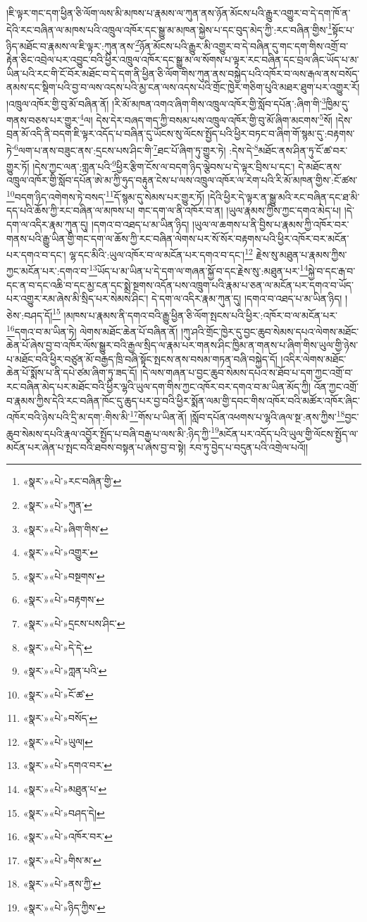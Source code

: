 །ཇི་ལྟར་གང་དག་ཕྱིན་ཅི་ལོག་ལས་མི་མཁས་པ་རྣམས་ལ་ཀུན་ནས་ཉོན་མོངས་པའི་རྒྱུར་འགྱུར་བ་དེ་དག་ཁོ་ན་དེའི་རང་བཞིན་ལ་མཁས་པའི་འཁྲུལ་འཁོར་དང་སྒྱུ་མ་མཁན་སྐྱེས་པ་དང་བུད་མེད་ཀྱི་:རང་བཞིན་གྱིས་\footnote{«སྣར་»«པེ་»རང་བཞིན་གྱི་}སྟོང་པ་ཉིད་མཐོང་བ་རྣམས་ལ་ཇི་ལྟར་:ཀུན་ནས་\footnote{«སྣར་»«པེ་»ཀུན་}ཉོན་མོངས་པའི་རྒྱུར་མི་འགྱུར་བ་དེ་བཞིན་དུ་གང་དག་གིས་འགྲོ་བ་རྟེན་ཅིང་འབྲེལ་པར་འབྱུང་བའི་ཕྱིར་འཁྲུལ་འཁོར་དང་སྒྱུ་མ་ལ་སོགས་པ་ལྟར་རང་བཞིན་དང་བྲལ་ཞིང་ཡོད་པ་མ་ཡིན་པའི་རང་གི་ངོ་བོར་མཐོང་བ་དེ་དག་ནི་ཕྱིན་ཅི་ལོག་གིས་ཀུན་ནས་བསྐྱེད་པའི་འཁོར་བ་ལས་རྒལ་ནས་བསོད་ནམས་དང་སྡིག་པའི་བྱ་བ་ལས་འདས་པའི་མྱ་ངན་ལས་འདས་པའི་གྲོང་ཁྱེར་གཅིག་པུའི་མཐར་ཐུག་པར་འགྱུར་རོ། །འཁྲུལ་འཁོར་གྱི་བུ་མོ་བཞིན་ནོ། །རི་མོ་མཁན་འགའ་ཞིག་གིས་འཁྲུལ་འཁོར་གྱི་སློབ་དཔོན་:ཞིག་གི་\footnote{«སྣར་»«པེ་»ཞིག་གིས་}ཁྱིམ་དུ་གནས་བཅས་པར་གྱུར་\footnote{«སྣར་»«པེ་»འགྱུར་}ལ། དེས་དེར་བཞད་གད་ཀྱི་བསམ་པས་འཁྲུལ་འཁོར་གྱི་བུ་མོ་ཞིག་མངགས་\footnote{«སྣར་»«པེ་»བསྔགས་}སོ། །དེས་བྲན་མོ་འདི་ནི་བདག་ཇི་ལྟར་འདོད་པ་བཞིན་དུ་ཡོངས་སུ་ལོངས་སྤྱོད་པའི་ཕྱིར་བཏང་བ་ཞིག་གོ་སྙམ་དུ་:བརྟགས་ཏེ་\footnote{«སྣར་»«པེ་»བརྟགས་}ལག་པ་ནས་བཟུང་ནས་:དྲངས་པས་ཤིང་གི་\footnote{«སྣར་»«པེ་»དྲངས་པས་ཤིང་}ཐང་པོ་ཞིག་ཏུ་གྱུར་ཏེ། :དེས་དེ་\footnote{«སྣར་»«པེ་»དེ་དེ་}མཐོང་ནས་ཤིན་ཏུ་ངོ་ཚ་བར་གྱུར་ཏོ། །དེས་ཀྱང་ལན་:གླན་པའི་\footnote{«སྣར་»«པེ་»ཀླན་པའི་}ཕྱིར་རྩིག་ངོས་ལ་བདག་ཉིད་ལྕེབས་པ་དེ་ལྟར་བྲིས་པ་དང་། དེ་མཐོང་ནས་འཁྲུལ་འཁོར་གྱི་སློབ་དཔོན་ཨེ་མ་ཀྱི་ཧུད་བརྟུན་ངེས་པ་ལས་འཁྲུལ་འཁོར་ལ་རེག་པའི་རི་མོ་མཁན་གྱིས་:ངོ་ཚས་\footnote{«སྣར་»«པེ་»ངོ་ཚ་}བདག་ཉིད་འགེགས་ཏེ་བསད་\footnote{«སྣར་»«པེ་»བསོད་}དོ་སྙམ་དུ་སེམས་པར་གྱུར་ཏོ། །དེའི་ཕྱིར་དེ་ལྟར་ན་སྒྱུ་མའི་རང་བཞིན་དང་ཐ་མི་དད་པའི་ཆོས་ཀྱི་རང་བཞིན་ལ་མཁས་པ། གང་དག་ལ་ནི་འཁོར་བ་ན། །ཡུལ་རྣམས་ཀྱིས་ཀྱང་དགའ་མེད་པ། །དེ་དག་ལ་འདིར་རྣམ་ཀུན་དུ། །དགའ་བ་འཐད་པ་མ་ཡིན་ཉིད། །ཡུལ་ལ་ཆགས་པ་ནི་བྱིས་པ་རྣམས་ཀྱི་འཁོར་བར་གནས་པའི་རྒྱུ་ཡིན་གྱི་གང་དག་ལ་ཆོས་ཀྱི་རང་བཞིན་ལེགས་པར་སོ་སོར་བརྟགས་པའི་ཕྱིར་འཁོར་བར་མངོན་པར་དགའ་བ་དང་། ལྷ་དང་མིའི་:ཡུལ་འཁོར་བ་ལ་མངོན་པར་དགའ་བ་དང་།\footnote{«སྣར་»«པེ་»ཡུལ།} རྗེས་སུ་མཐུན་པ་རྣམས་ཀྱིས་ཀྱང་མངོན་པར་:དགའ་བ་\footnote{«སྣར་»«པེ་»དགའ་བར་}ཡོད་པ་མ་ཡིན་པ་དེ་དག་ལ་གཞན་སྐྱོ་བ་དང་རྗེས་སུ་:མཐུན་པར་\footnote{«སྣར་»«པེ་»མཐུན་པ་}སྐྱེ་བ་དང་རྒ་བ་དང་ན་བ་དང་འཆི་བ་དང་མྱ་ངན་དང་སྨྲེ་སྔགས་འདོན་པས་འཁྲུག་པའི་རྣམ་པ་ཅན་ལ་མངོན་པར་དགའ་བ་ཡོད་པར་འགྱུར་རམ་ཞེས་མི་སྲིད་པར་སེམས་ཤིང་། དེ་དག་ལ་འདིར་རྣམ་ཀུན་དུ། །དགའ་བ་འཐད་པ་མ་ཡིན་ཉིད། །ཅེས་:བཤད་དོ།\footnote{«སྣར་»«པེ་»བཤད་དེ།} །མཁས་པ་རྣམས་ནི་དགའ་བའི་རྒྱུ་ཕྱིན་ཅི་ལོག་སྤངས་པའི་ཕྱིར་:འཁོར་བ་ལ་མངོན་པར་\footnote{«སྣར་»«པེ་»འཁོར་བར་}དགའ་བ་མ་ཡིན་ཏེ། ལེགས་མཐོང་ཆེན་པོ་བཞིན་ནོ། །ཀུ་ཤའི་གྲོང་ཁྱེར་དུ་བྱང་ཆུབ་སེམས་དཔའ་ལེགས་མཐོང་ཆེན་པོ་ཞེས་བྱ་བ་འཁོར་ལོས་སྒྱུར་བའི་རྒྱལ་སྲིད་ལ་རྣམ་པར་གནས་ཤིང་ཁྱིམ་ན་གནས་པ་ཞིག་གིས་ཡུལ་གྱི་ཉེས་པ་མཐོང་བའི་ཕྱིར་བཙུན་མོ་བརྒྱད་ཁྲི་བཞི་སྟོང་སྤངས་ནས་བསམ་གཏན་བཞི་བསྐྱེད་དོ། །འདིར་ལེགས་མཐོང་ཆེན་པོ་སྨོས་པ་ནི་དཔེ་ཙམ་ཞིག་ཏུ་ཟད་དོ། །དེ་ལས་གཞན་པ་བྱང་ཆུབ་སེམས་དཔའ་ས་ཐོབ་པ་དག་ཀྱང་འགྲོ་བ་རང་བཞིན་མེད་པར་མཐོང་བའི་ཕྱིར་ལྷའི་ཡུལ་དག་གིས་ཀྱང་འཁོར་བར་དགའ་བ་མ་ཡིན་མོད་ཀྱི། འོན་ཀྱང་འགྲོ་བ་རྣམས་ཀྱིས་དེའི་རང་བཞིན་ཁོང་དུ་ཆུད་པར་བྱ་བའི་ཕྱིར་སྨོན་ལམ་གྱི་དབང་གིས་འཁོར་བའི་མཚོར་འཁོར་ཞིང་འཁོར་བའི་ཉེས་པའི་དྲི་མ་དག་:གིས་མི་\footnote{«སྣར་»«པེ་»གིས་མ་}གོས་པ་ཡིན་ནོ། །སློབ་དཔོན་འཕགས་པ་ལྷའི་ཞལ་སྔ་:ནས་ཀྱིས་\footnote{«སྣར་»«པེ་»ནས་ཀྱི་}བྱང་ཆུབ་སེམས་དཔའི་རྣལ་འབྱོར་སྤྱོད་པ་བཞི་བརྒྱ་པ་ལས་མི་:ཉིད་ཀྱི་\footnote{«སྣར་»«པེ་»ཉིད་ཀྱིས་}མངོན་པར་འདོད་པའི་ཡུལ་གྱི་ལོངས་སྤྱོད་ལ་མངོན་པར་ཞེན་པ་སྤང་བའི་ཐབས་བསྟན་པ་ཞེས་བྱ་བ་སྟེ། རབ་ཏུ་བྱེད་པ་བདུན་པའི་འགྲེལ་པའོ།། 